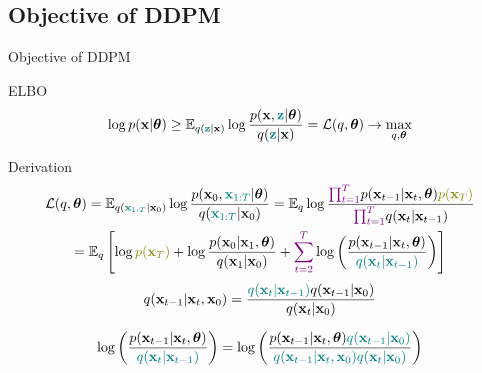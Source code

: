 \subsection{Objective of DDPM}
\begin{frame}{Objective of DDPM}
	\begin{block}{ELBO}
		\vspace{-0.4cm}
		\[
			\log p(\mathbf{x} | \boldsymbol{\theta}) \geq \mathbb{E}_{q({\color{teal}\mathbf{z}} | \mathbf{x})} \log \frac{p(\mathbf{x}, {\color{teal}\mathbf{z}} | \boldsymbol{\theta})}{q({\color{teal}\mathbf{z}} | \mathbf{x})} = \mathcal{L}(q, \boldsymbol{\theta}) \rightarrow \max_{q, \boldsymbol{\theta}}
		\]
		\vspace{-0.5cm}
	\end{block}
	\begin{block}{Derivation}
		{\small
		\begin{multline*}
			\cL(q, \btheta) = \bbE_{q({\color{teal}\bx_{1:T}} | \bx_0)} \log \frac{p(\bx_0, {\color{teal}\bx_{1:T}} | \btheta)}{q({\color{teal}\bx_{1:T}} | \bx_0)} =  \bbE_{q} \log \frac{{\color{violet}\prod_{t=1}^T} p(\bx_{t-1} | \bx_t, \btheta) {\color{olive}p(\bx_T)} }{{\color{violet}\prod_{t=1}^T} q(\bx_t | \bx_{t-1})}  \\ 
			= \bbE_{q} \left[ \log {\color{olive}p(\bx_T)} + \log \frac{p(\bx_0 | \bx_1, \btheta)}{q(\bx_1 | \bx_0)}  + {\color{violet}\sum_{t=2}^T} \log \left( \frac{p(\bx_{t-1} | \bx_t, \btheta)}{{\color{teal}q(\bx_t | \bx_{t-1})}}\right)\right]
		\end{multline*}
		}
		\vspace{-0.3cm}
		\[
			q(\mathbf{x}_{t-1}|\mathbf{x}_{t}, \mathbf{x}_0) = \frac{{\color{teal} q(\mathbf{x}_{t}|\mathbf{x}_{t-1})} q(\mathbf{x}_{t-1} |\mathbf{x}_0) }{q(\mathbf{x}_{t}| \mathbf{x}_0)} 
		\]
		
		\[
			\log \left( \frac{p(\mathbf{x}_{t-1} | \mathbf{x}_t, \boldsymbol{\theta})}{{\color{teal}q(\mathbf{x}_t | \mathbf{x}_{t-1})}}\right) = \log \left( \frac{p(\mathbf{x}_{t-1} | \mathbf{x}_t, \boldsymbol{\theta}) {\color{teal} q(\mathbf{x}_{t-1}|\mathbf{x}_{0})}}{{\color{teal} q(\mathbf{x}_{t-1}|\mathbf{x}_{t}, \mathbf{x}_0) q(\mathbf{x}_{t}| \mathbf{x}_0)}}\right)
		\]
	\end{block}
	
\end{frame}
